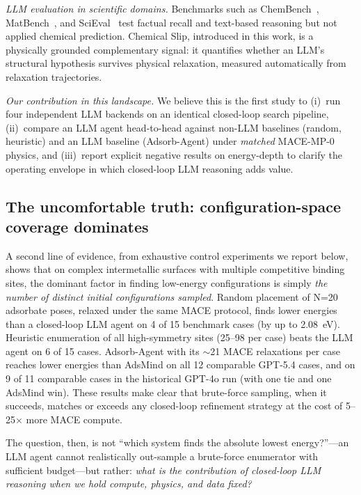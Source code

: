 \textit{LLM evaluation in scientific domains.}
Benchmarks such as ChemBench~\cite{mirza2024chembench}, MatBench~\cite{dunn2020benchmarking}, and SciEval~\cite{sun2024scieval} test factual recall and text-based reasoning but not applied chemical prediction.
Chemical Slip, introduced in this work, is a physically grounded complementary signal: it quantifies whether an LLM's structural hypothesis survives physical relaxation, measured automatically from relaxation trajectories.

\textit{Our contribution in this landscape.}
We believe this is the first study to (i)~run four independent LLM backends on an identical closed-loop search pipeline, (ii)~compare an LLM agent head-to-head against non-LLM baselines (random, heuristic) and an LLM baseline (Adsorb-Agent) under \textit{matched} MACE-MP-0 physics, and (iii)~report explicit negative results on energy-depth to clarify the operating envelope in which closed-loop LLM reasoning adds value.

\subsection{The uncomfortable truth: configuration-space coverage dominates}

A second line of evidence, from exhaustive control experiments we report below, shows that on complex intermetallic surfaces with multiple competitive binding sites, the dominant factor in finding low-energy configurations is simply \textit{the number of distinct initial configurations sampled}.
Random placement of N=20 adsorbate poses, relaxed under the same MACE protocol, finds lower energies than a closed-loop LLM agent on 4 of 15 benchmark cases (by up to 2.08~eV).
Heuristic enumeration of all high-symmetry sites (25--98 per case) beats the LLM agent on 6 of 15 cases.
Adsorb-Agent with its $\sim$21 MACE relaxations per case reaches lower energies than AdsMind on all 12 comparable GPT-5.4 cases, and on 9 of 11 comparable cases in the historical GPT-4o run (with one tie and one AdsMind win).
These results make clear that brute-force sampling, when it succeeds, matches or exceeds any closed-loop refinement strategy at the cost of 5--25$\times$ more MACE compute.

The question, then, is not ``which system finds the absolute lowest energy?''---an LLM agent cannot realistically out-sample a brute-force enumerator with sufficient budget---but rather: \textit{what is the contribution of closed-loop LLM reasoning when we hold compute, physics, and data fixed?}

